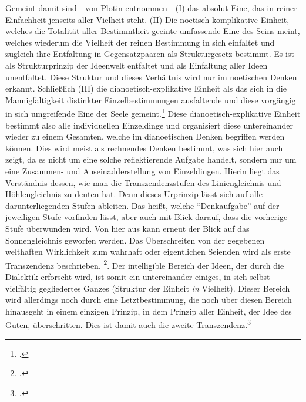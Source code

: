 Gemeint damit sind - von Plotin entnommen - (I) das absolut Eine, das in reiner Einfachheit jenseits aller Vielheit steht. (II) Die noetisch-komplikative Einheit, welches die Totalität aller Bestimmtheit geeinte umfassende Eine des Seins meint, welches wiederum die Vielheit der reinen Bestimmung in sich einfaltet und zugleich ihre Entfaltung in Gegensatzpaaren als Strukturgesetz bestimmt. Es ist als Strukturprinzip der Ideenwelt entfaltet und als Einfaltung aller Ideen unentfaltet. Diese Struktur und dieses Verhältnis wird nur im noetischen Denken erkannt. Schließlich (III) die dianoetisch-explikative Einheit als das sich in die Mannigfaltigkeit distinkter Einzelbestimmungen ausfaltende und diese vorgängig in sich umgreifende Eine der Seele gemeint.\footcite[vgl.][S. 190]{halfwassenaufstieg2006} Diese dianoetisch-explikative Einheit bestimmt also alle individuellen Einzeldinge und organisiert diese untereinander wieder zu einem Gesamten, welche im dianoetischen Denken begriffen werden können. Dies wird meist als rechnendes Denken bestimmt, was sich hier auch zeigt, da es nicht um eine solche reflektierende Aufgabe handelt, sondern nur um eine Zusammen- und Auseinadderstellung von Einzeldingen.
Hierin liegt das Verständnis dessen, wie man die Transzendenzstufen des Liniengleichnis und Höhlengleichnis zu deuten hat. Denn dieses Urprinzip lässt sich auf alle darunterliegenden Stufen ableiten. Das heißt, welche \enquote{Denkaufgabe} auf der jeweiligen Stufe vorfinden lässt, aber auch mit Blick darauf, dass die vorherige Stufe überwunden wird.
Von hier aus kann erneut der Blick auf das Sonnengleichnis geworfen werden.
Das Überschreiten von der gegebenen welthaften Wirklichkeit zum wahrhaft oder eigentlichen Seienden wird als erste Transzendenz beschrieben. \footcite[vgl.][S. 222]{halfwassenaufstieg2006}.
Der intelligible Bereich der Ideen, der durch die Dialektik erforscht wird, ist somit ein untereinander einiges, in sich selbst vielfältig gegliedertes Ganzes (Struktur der Einheit \emph{in} Vielheit). Dieser Bereich wird allerdings noch durch eine Letztbestimmung, die noch über diesen Bereich hinausgeht in einem einzigen Prinzip, in dem Prinzip aller Einheit, der Idee des Guten, überschritten. Dies ist damit auch die zweite Transzendenz.\footcite[vgl.][S. 223f.]{halfwassenaufstieg2006}
